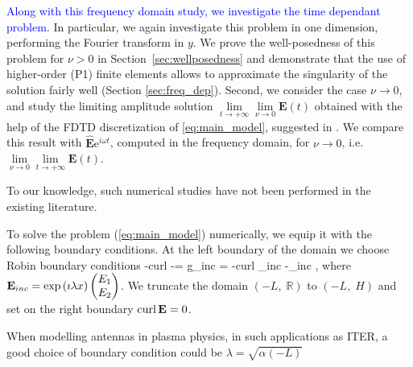 \textcolor{blue}{Along with this frequency domain study, we investigate the time dependant problem.}\urev{ We assume $\alpha(\omega)$ and $\delta(\omega)$ be sufficiently smooth, i.e. bounded and continuous in  
$\left[-L,\; \mathbb{R}\right)$.}
In particular, we again investigate this problem in one dimension, performing the Fourier transform in $y$.
We prove the well-posedness of this problem for $\nu>0$ in Section~\ref{sec:wellposedness} and 
demonstrate that the use of higher-order (P1) finite elements allows to approximate the singularity 
of the solution fairly well (Section \ref{sec:freq_dep}). 
Second, we consider the case $\nu\rightarrow 0$, and study the limiting amplitude solution 
$\lim\limits_{t\rightarrow +\infty}\lim\limits_{\nu\rightarrow 0}\mathbf{E}(t)$ obtained with the help of 
the FDTD discretization of \eqref{eq:main_model}, suggested in \cite{stable_yee_plasma_current}. 
We compare this result with 
$\hat{\mathbf{E}}\mathrm{e}^{i\omega t}$, computed in the frequency domain, for $\nu\rightarrow 0$, i.e.
$\lim\limits_{\nu\rightarrow 0}\lim\limits_{t\rightarrow+\infty}\mathbf{E}(t)$.

To our knowledge, such numerical studies have not been performed in the existing literature. 

To solve the problem (\ref{eq:main_model}) numerically, we equip it with the following boundary conditions.
At the left boundary of the domain we choose Robin boundary conditions 
\be
-curl \E -\imath \lambda\E \wedge \n = g_{inc} = -curl \E_{inc} -\imath\lambda\E_{inc} \wedge \n,
\ee
where ${\bf E}_{inc} = \exp \left(\imath \lambda x\right)\begin{pmatrix} E_1\\ E_2 \end{pmatrix}$. We truncate the domain 
$(-L,\; \mathbb{R})$ to $(-L,\; H)$ and set on the right boundary $\operatorname{curl} {\bf E} = 0$. 
\begin{remark}
	When modelling antennas in plasma physics, in such applications as ITER, 
	a good choice of boundary condition could be $\lambda = \sqrt{\alpha(-L)}$
\end{remark}
